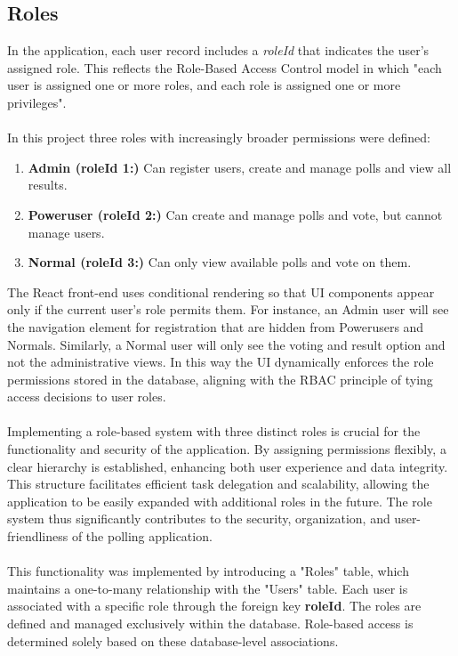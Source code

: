 \documentclass[a4paper,12pt]{report}
\begin{document}
\subsection{Roles}
In the application, each user record includes a \textit{roleId} that indicates the user's assigned role. This reflects the Role-Based Access Control model in which "each user is assigned one or more roles, and each role is assigned one or more privileges".\parencite{rbac}\\\\
In this project three roles with increasingly broader permissions were defined:
\begin{enumerate}
	\item \textbf{Admin (roleId 1:)} Can register users, create and manage polls and view all results.
	\item \textbf{Poweruser (roleId 2:)} Can create and manage polls and vote, but cannot manage users.
	\item \textbf{Normal (roleId 3:)} Can only view available  polls and vote on them.
\end{enumerate}
The React front-end uses conditional rendering so that UI components appear only if the current user's role permits them. For instance, an Admin user will see the navigation element for registration that are hidden from Powerusers and Normals. Similarly, a Normal user will only see the voting and result option and not the administrative views. In this way the UI dynamically enforces the role permissions stored in the database, aligning with the RBAC principle of tying access decisions to user roles.\parencite{rbac}\\\\
Implementing a role-based system with three distinct roles is crucial for the functionality and security of the application. By assigning permissions flexibly, a clear hierarchy is established, enhancing both user experience and data integrity. This structure facilitates efficient task delegation and scalability, allowing the application to be easily expanded with additional roles in the future. The role system thus significantly contributes to the security, organization, and user-friendliness of the polling application.\\\\
This functionality was implemented by introducing a "Roles" table, which maintains a one-to-many relationship with the "Users" table. Each user is associated with a specific role through the foreign key \textbf{roleId}. The roles are defined and managed exclusively within the database. Role-based access is determined solely based on these database-level associations.\\\\
\end{document}
